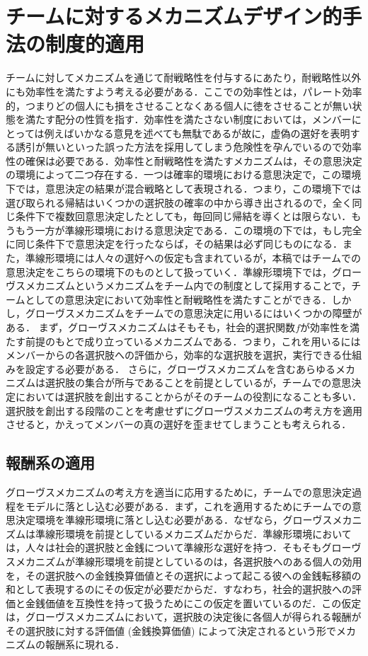 \documentclass[a4paper, 11pt]{jsarticle}
\begin{document}
\section{チームに対するメカニズムデザイン的手法の制度的適用}
チームに対してメカニズムを通じて耐戦略性を付与するにあたり，耐戦略性以外にも効率性を満たすよう考える必要がある．ここでの効率性とは，パレート効率的，つまりどの個人にも損をさせることなくある個人に徳をさせることが無い状態を満たす配分の性質を指す．効率性を満たさない制度においては，メンバーにとっては例えばいかなる意見を述べても無駄であるが故に，虚偽の選好を表明する誘引が無いといった誤った方法を採用してしまう危険性を孕んでいるので効率性の確保は必要である．効率性と耐戦略性を満たすメカニズムは，その意思決定の環境によって二つ存在する．一つは確率的環境における意思決定で，この環境下では，意思決定の結果が混合戦略として表現される．つまり，この環境下では選び取られる帰結はいくつかの選択肢の確率の中から導き出されるので，全く同じ条件下で複数回意思決定したとしても，毎回同じ帰結を導くとは限らない．もうもう一方が準線形環境における意思決定である．この環境の下では，もし完全に同じ条件下で意思決定を行ったならば，その結果は必ず同じものになる．また，準線形環境には人々の選好への仮定も含まれているが，本稿ではチームでの意思決定をこちらの環境下のものとして扱っていく．準線形環境下では，グローヴスメカニズムというメカニズムをチーム内での制度として採用することで，チームとしての意思決定において効率性と耐戦略性を満たすことができる．しかし，グローヴスメカニズムをチームでの意思決定に用いるにはいくつかの障壁がある．
まず，グローヴスメカニズムはそもそも，社会的選択関数\(f\)が効率性を満たす前提のもとで成り立っているメカニズムである．つまり，これを用いるにはメンバーからの各選択肢への評価から，効率的な選択肢を選択，実行できる仕組みを設定する必要がある．
さらに，グローヴスメカニズムを含むあらゆるメカニズムは選択肢の集合が所与であることを前提としているが，チームでの意思決定においては選択肢を創出することからがそのチームの役割になることも多い．選択肢を創出する段階のことを考慮せずにグローヴスメカニズムの考え方を適用させると，かえってメンバーの真の選好を歪ませてしまうことも考えられる．

\subsection{報酬系の適用}
グローヴスメカニズムの考え方を適当に応用するために，チームでの意思決定過程をモデルに落とし込む必要がある．まず，これを適用するためにチームでの意思決定環境を準線形環境に落とし込む必要がある．なぜなら，グローヴスメカニズムは準線形環境を前提としているメカニズムだからだ．準線形環境においては，人々は社会的選択肢と金銭について準線形な選好を持つ．そもそもグローヴスメカニズムが準線形環境を前提としているのは，各選択肢へのある個人の効用を，その選択肢への金銭換算価値とその選択によって起こる彼への金銭転移額の和として表現するのにその仮定が必要だからだ．すなわち，社会的選択肢への評価と金銭価値を互換性を持って扱うためにこの仮定を置いているのだ．この仮定は，グローヴスメカニズムにおいて，選択肢の決定後に各個人が得られる報酬がその選択肢に対する評価値 (金銭換算価値) によって決定されるという形でメカニズムの報酬系に現れる．
\end{document}
